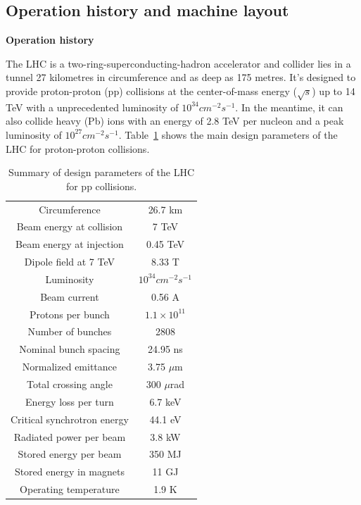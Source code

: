 \subsection{Operation history and machine layout}

\textbf{Operation history}

The LHC \cite{Bruning:2004ej, Buning:2004wk, Benedikt:2004wm, Evans_2008} 
is a two-ring-superconducting-hadron accelerator and collider lies in a tunnel 27 kilometres in circumference and as deep as 175 metres.
It's designed to provide proton-proton (pp) collisions at the center-of-mass energy ($\sqrt{s}$) up to 14 TeV
with a unprecedented luminosity of $10^{34} cm^{-2} s^{-1}$.
In the meantime, it can also collide heavy (Pb) ions with an energy of 2.8 TeV per nucleon and a peak luminosity of $10^{27} cm^{-2} s^{-1}$.
Table~\ref{tab:LHC_parameters} shows the main design parameters of the LHC for proton-proton collisions.
\begin{table}[htbp]
  \centering
  \caption{Summary of design parameters of the LHC for pp collisions.}
  \label{tab:LHC_parameters}
  \begin{tabular}{cc}
    \hline
    Circumference	& 26.7 km\\
    Beam energy at collision	& 7 TeV\\
    Beam energy at injection	& 0.45 TeV \\
    Dipole field at 7 TeV	& 8.33 T \\
    Luminosity		& $10^{34} cm^{-2} s^{-1}$ \\
    Beam current	& 0.56 A \\
    Protons per bunch	& $1.1 \times 10^{11}$ \\
    Number of bunches	& 2808 \\
    Nominal bunch spacing	& 24.95 ns \\
    Normalized emittance	& 3.75 $\mu$m \\
    Total crossing angle	& 300 $\mu$rad \\
    Energy loss per turn	& 6.7 keV \\
    Critical synchrotron energy	& 44.1 eV \\
    Radiated power per beam	& 3.8 kW \\
    Stored energy per beam	& 350 MJ \\
    Stored energy in magnets	& 11 GJ \\
    Operating temperature	& 1.9 K \\
    \hline
  \end{tabular}
\end{table}

